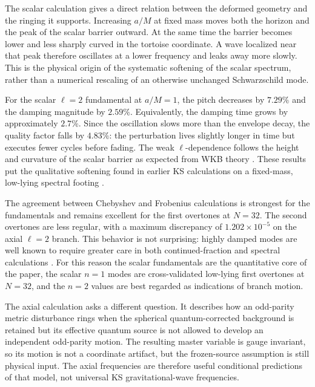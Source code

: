 \documentclass[12pt,a4paper]{article}
\begin{document}
The scalar calculation gives a direct relation between the deformed geometry
and the ringing it supports.  Increasing \(a/M\) at fixed mass moves both the
horizon and the peak of the scalar barrier outward.  At the same time the
barrier becomes lower and less sharply curved in the tortoise coordinate.  A
wave localized near that peak therefore oscillates at a lower frequency and
leaks away more slowly.  This is the physical origin of the systematic
softening of the scalar spectrum, rather than a numerical rescaling of an
otherwise unchanged Schwarzschild mode.

For the scalar \(\ell=2\) fundamental at \(a/M=1\), the pitch decreases by
\(7.29\%\) and the damping magnitude by \(2.59\%\).  Equivalently, the damping
time grows by approximately \(2.7\%\).  Since the oscillation slows more than
the envelope decay, the quality factor falls by \(4.83\%\): the perturbation
lives slightly longer in time but executes fewer cycles before fading.  The
weak \(\ell\)-dependence follows the height and curvature of the scalar barrier
as expected from WKB theory \cite{Ferrari1984,Konoplya2003}.  These results put
the qualitative softening found in earlier KS calculations on a fixed-mass,
low-lying spectral footing \cite{Konoplya2020,Bolokhov2025}.

The agreement between Chebyshev and Frobenius calculations is strongest for the
fundamentals and remains excellent for the first overtones at \(N=32\). The
second overtones are less regular, with a maximum discrepancy of
\(1.202\times10^{-5}\) on the axial \(\ell=2\) branch. This behavior is not
surprising: highly damped modes are well known to require greater care in both
continued-fraction and spectral calculations \cite{Leaver1985,Nollert1993,Bolokhov2025,Chen2025}.
For this reason the scalar fundamentals are the quantitative core of the paper,
the scalar \(n=1\) modes are cross-validated low-lying first overtones at
\(N=32\), and the \(n=2\) values are best regarded as indications of branch
motion.

The axial calculation asks a different question.  It describes how an
odd-parity metric disturbance rings when the spherical quantum-corrected
background is retained but its effective quantum source is not allowed to
develop an independent odd-parity motion.  The resulting master variable is
gauge invariant, so its motion is not a coordinate artifact, but the
frozen-source assumption is still physical input.  The axial frequencies are
therefore useful conditional predictions of that model, not universal KS
gravitational-wave frequencies.
\end{document}
